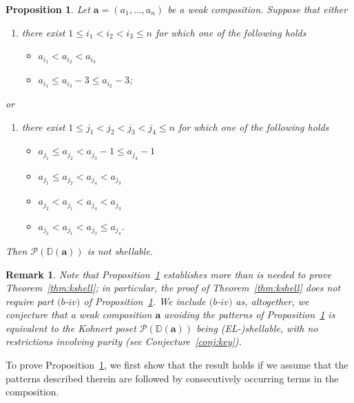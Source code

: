 \documentclass[letterpaper,10pt]{article}
\newtheorem{prop}[theorem]{Proposition}
\newtheorem{remark}[theorem]{Remark}
\begin{document}
\begin{prop}\label{prop:keynecrank}
    Let $\mathbf{a}=(a_1,\hdots,a_n)$ be a weak composition. Suppose that either 
    \begin{enumerate}
        \item[\textup{(a)}] there exist $1\le i_1<i_2<i_3\le n$ for which one of the following holds
    \begin{itemize}
    \item[\textup{(i)}] $a_{i_1}<a_{i_2}<a_{i_3}$
    \item[\textup{(ii)}] $a_{i_1}\le a_{i_3}-3\le a_{i_2}-3$;
    \end{itemize}
    \end{enumerate}
    or
    \begin{enumerate}
        \item[\textup{(b)}] there exist $1\le j_1<j_2<j_3<j_4\le n$ for which one of the following holds
    \begin{itemize}
    \item[\textup{(i)}] $a_{j_1}\le a_{j_2}<a_{j_3}-1\le a_{j_4}-1$
    \item[\textup{(ii)}] $a_{j_1}\le a_{j_2}<a_{j_4}< a_{j_3}$
    \item[\textup{(iii)}] $a_{j_2}< a_{j_1}<a_{j_4}< a_{j_3}$
    \item[\textup{(iv)}] $a_{j_2}< a_{j_1}<a_{j_3}\le a_{j_4}.$
\end{itemize}
    \end{enumerate}
Then $\mathcal{P}(\mathbb{D}(\mathbf{a}))$ is not shellable.
\end{prop}

\begin{remark}
    Note that Proposition~\ref{prop:keynecrank} establishes more than is needed to prove Theorem~\ref{thm:kshell}; in particular, the proof of Theorem~\ref{thm:kshell} does not require part $(b$-$iv)$ of Proposition~\ref{prop:keynecrank}. We include $(b$-$iv)$ as, altogether, we conjecture that a weak composition $\mathbf{a}$ avoiding the patterns of Proposition~\ref{prop:keynecrank} is equivalent to the Kohnert poset $\mathcal{P}(\mathbb{D}(\mathbf{a}))$ being \textup(EL-\textup)shellable, with no restrictions involving purity \textup(see Conjecture~\ref{conj:key}\textup).
\end{remark}

To prove Proposition~\ref{prop:keynecrank}, we first show that the result holds if we assume that the patterns described therein are followed by consecutively occurring terms in the composition.
\end{document}
